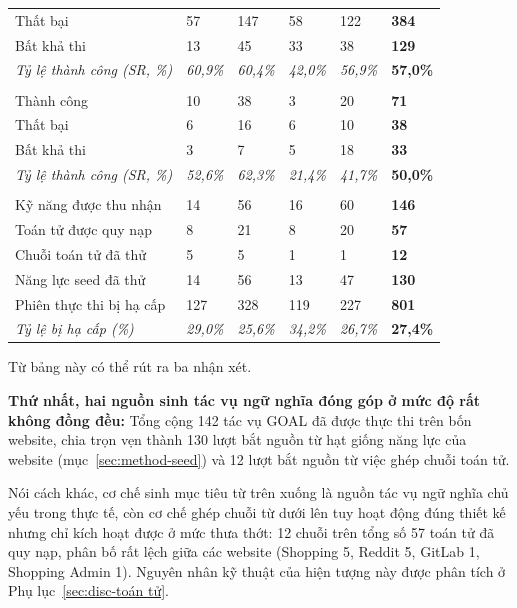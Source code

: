 \begin{table}[htbp]
\begin{tabular}{@{}L{4.9cm} R{1.7cm} R{1.5cm} R{1.5cm} R{1.9cm} R{1.6cm}@{}}
    \quad Thất bại & 57 & 147 & 58 & 122 & \textbf{384} \\
    \quad Bất khả thi & 13 & 45 & 33 & 38 & \textbf{129} \\
    \quad \textit{Tỷ lệ thành công (SR, \%)} & \textit{60,9\%} & \textit{60,4\%} &
    \textit{42,0\%} & \textit{56,9\%} & \textbf{57,0\%} \\
    \addlinespace
     \\
    \quad Thành công & 10 & 38 & 3 & 20 & \textbf{71} \\
    \quad Thất bại & 6 & 16 & 6 & 10 & \textbf{38} \\
    \quad Bất khả thi & 3 & 7 & 5 & 18 & \textbf{33} \\
    \quad \textit{Tỷ lệ thành công (SR, \%)} & \textit{52,6\%} & \textit{62,3\%} &
    \textit{21,4\%} & \textit{41,7\%} & \textbf{50,0\%} \\
    \addlinespace
     \\
    \quad Kỹ năng được thu nhận & 14 & 56 & 16 & 60 & \textbf{146} \\
    \quad Toán tử được quy nạp & 8 & 21 & 8 & 20 & \textbf{57} \\
    \quad Chuỗi toán tử đã thử & 5 & 5 & 1 & 1 & \textbf{12} \\
    \quad Năng lực seed đã thử & 14 & 56 & 13 & 47 & \textbf{130} \\
    \midrule
    Phiên thực thi bị hạ cấp & 127 & 328 & 119 & 227 & \textbf{801} \\
    \textit{Tỷ lệ bị hạ cấp (\%)} & \textit{29,0\%} & \textit{25,6\%} &
    \textit{34,2\%} & \textit{26,7\%} & \textbf{27,4\%} \\
    \bottomrule
  \end{tabular}
\end{table}

Từ bảng này có thể rút ra ba nhận xét.

\textbf{Thứ nhất, hai nguồn sinh tác vụ ngữ nghĩa đóng góp ở mức độ rất không đồng đều:} Tổng cộng 142 tác vụ GOAL đã được thực thi trên bốn website, chia trọn vẹn thành 130 lượt bắt nguồn từ hạt giống năng lực của website (mục~\ref{sec:method-seed}) và 12 lượt bắt nguồn từ việc ghép chuỗi toán tử.

Nói cách khác, cơ chế sinh mục tiêu từ trên xuống là nguồn tác vụ ngữ nghĩa chủ yếu trong thực tế, còn cơ chế ghép chuỗi từ dưới lên tuy hoạt động đúng thiết kế nhưng chỉ kích hoạt được ở mức thưa thớt: 12 chuỗi trên tổng số 57 toán tử đã quy nạp, phân bố rất lệch giữa các website (Shopping 5, Reddit 5, GitLab 1, Shopping Admin 1). Nguyên nhân kỹ thuật của hiện tượng này được phân tích ở Phụ lục~\ref{sec:disc-toán tử}.


